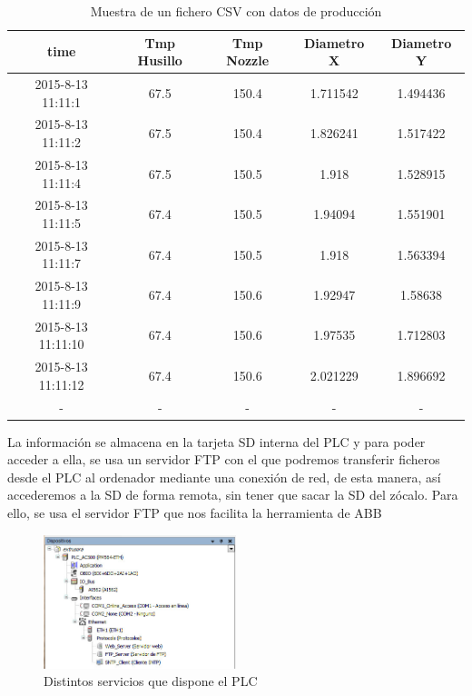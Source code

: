 \begin{table}[H]
\centering
\begin{tabular}{ccccc}
{\bf time}         & {\bf Tmp Husillo} & {\bf Tmp Nozzle} & {\bf Diametro X} & {\bf Diametro Y} \\ \hline
2015-8-13 11:11:1  & 67.5              & 150.4            & 1.711542         & 1.494436         \\
2015-8-13 11:11:2  & 67.5              & 150.4            & 1.826241         & 1.517422         \\
2015-8-13 11:11:4  & 67.5              & 150.5            & 1.918            & 1.528915         \\
2015-8-13 11:11:5  & 67.4              & 150.5            & 1.94094          & 1.551901         \\
2015-8-13 11:11:7  & 67.4              & 150.5            & 1.918            & 1.563394         \\
2015-8-13 11:11:9  & 67.4              & 150.6            & 1.92947          & 1.58638          \\
2015-8-13 11:11:10 & 67.4              & 150.6            & 1.97535          & 1.712803         \\
2015-8-13 11:11:12 & 67.4              & 150.6            & 2.021229         & 1.896692        \\
        -          &    -              & -                & -                & -
\end{tabular}
\caption{Muestra de un fichero CSV con datos de producción}
\label{tab:plc_csv}
\end{table}

La información se almacena en la tarjeta SD interna del PLC y para poder acceder a ella, se usa un servidor FTP con el que podremos transferir ficheros desde el PLC al ordenador mediante una conexión de red, de esta manera, así accederemos a la SD de forma remota, sin tener que sacar la SD del zócalo. Para ello, se usa el servidor FTP que nos facilita la herramienta de ABB\\

    \begin{figure}[H]
            \centering
            \includegraphics[width=0.5\textwidth]{images/PLC/servicios_plc.jpg}
            \caption{Distintos servicios que dispone el PLC}
            \label{fig:plc_servicios}
    \end{figure}

